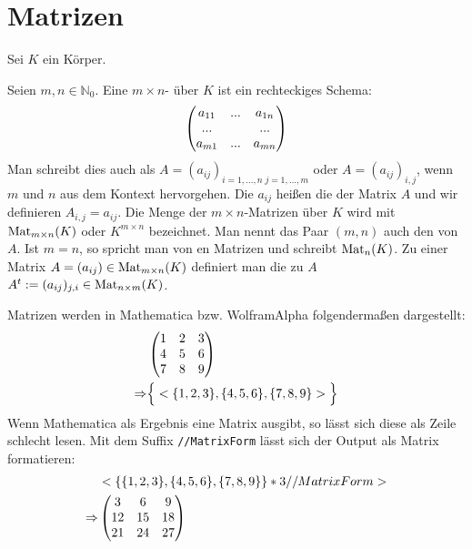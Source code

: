 \section{Matrizen}

Sei $K$ ein Körper.

\begin{definition}[Matrix]
	Seien $m,n \in \mathbb N_0$. Eine $m\times n$- über $K$ ist ein rechteckiges 
	Schema:
	\begin{align}
		\begin{pmatrix}
		a_{11} & ... & a_{1n}\\
		... &  & ...\\
		a_{m1} & ... & a_{mn}\\
		\end{pmatrix}\notag
	\end{align}
	Man schreibt dies auch als $A=(a_{ij})_{i=1,...,n \; j=1,...,m}$ oder $A=(a_{ij})_{i,j}$, wenn $m$ und $n$ 
	aus dem Kontext hervorgehen. Die $a_{ij}$ heißen die  der Matrix $A$ und wir definieren $A_{i,j}=
	a_{ij}$. Die Menge der $m\times n$-Matrizen über $K$ wird mit $\Mat_{m\times n}(K)$ oder $K^{m\times n}$ 
	bezeichnet. Man nennt das Paar $(m,n)$ auch den  von $A$. Ist $m=n$, so spricht man von en 
	Matrizen und schreibt $\Mat_n(K)$. Zu einer Matrix $A=(a_{ij}) \in \Mat_{m\times n}(K)$ definiert man die zu $A$ 
	 $A^t := (a_{ij})_{j,i} \in \Mat_{n\times m}(K)$.
\end{definition}

\begin{mathematica}[Matrizen]
	Matrizen werden in Mathematica bzw. WolframAlpha folgendermaßen dargestellt:
	\begin{align}
		&\begin{pmatrix}1&2&3\\4&5&6\\7&8&9\end{pmatrix}\notag \\
		\Rightarrow&\Big\lbrace\texttt{\{1,2,3\},\{4,5,6\},\{7,8,9\}}\Big\rbrace\notag
	\end{align}
	Wenn Mathematica als Ergebnis eine Matrix ausgibt, so lässt sich diese als Zeile schlecht lesen. Mit dem Suffix \texttt{//MatrixForm} lässt sich der Output als Matrix formatieren:
	\begin{align}
		&\texttt{\{\{1,2,3\},\{4,5,6\},\{7,8,9\}\}*3 //MatrixForm}\notag \\
		\Rightarrow&\begin{pmatrix}3&6&9\\12&15&18\\21&24&27\end{pmatrix}\notag
	\end{align}
\end{mathematica}

